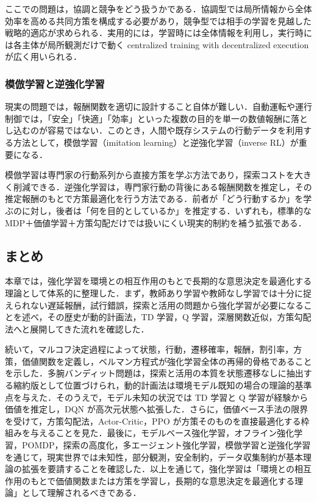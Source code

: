 ここでの問題は，協調と競争をどう扱うかである．協調型では局所情報から全体効率を高める共同方策を構成する必要があり，競争型では相手の学習を見越した戦略的適応が求められる．実用的には，学習時には全体情報を利用し，実行時には各主体が局所観測だけで動く centralized training with decentralized execution が広く用いられる．

\subsubsection{模倣学習と逆強化学習}

現実の問題では，報酬関数を適切に設計すること自体が難しい．自動運転や運行制御では，「安全」「快適」「効率」といった複数の目的を単一の数値報酬に落とし込むのが容易ではない．このとき，人間や既存システムの行動データを利用する方法として，模倣学習（imitation learning）と逆強化学習（inverse RL）が重要になる．

模倣学習は専門家の行動系列から直接方策を学ぶ方法であり，探索コストを大きく削減できる．逆強化学習は，専門家行動の背後にある報酬関数を推定し，その推定報酬のもとで方策最適化を行う方法である．前者が「どう行動するか」を学ぶのに対し，後者は「何を目的としているか」を推定する．いずれも，標準的な MDP＋価値学習＋方策勾配だけでは扱いにくい現実的制約を補う拡張である．

\subsection{まとめ}

本章では，強化学習を環境との相互作用のもとで長期的な意思決定を最適化する理論として体系的に整理した．まず，教師あり学習や教師なし学習では十分に捉えられない遅延報酬，試行錯誤，探索と活用の問題から強化学習が必要になることを述べ，その歴史が動的計画法，TD 学習，Q 学習，深層関数近似，方策勾配法へと展開してきた流れを確認した．

続いて，マルコフ決定過程によって状態，行動，遷移確率，報酬，割引率，方策，価値関数を定義し，ベルマン方程式が強化学習全体の再帰的骨格であることを示した．多腕バンディット問題は，探索と活用の本質を状態遷移なしに抽出する縮約版として位置づけられ，動的計画法は環境モデル既知の場合の理論的基準点を与えた．そのうえで，モデル未知の状況では TD 学習と Q 学習が経験から価値を推定し，DQN が高次元状態へ拡張した．さらに，価値ベース手法の限界を受けて，方策勾配法，Actor-Critic，PPO が方策そのものを直接最適化する枠組みを与えることを見た．最後に，モデルベース強化学習，オフライン強化学習，POMDP，探索の高度化，多エージェント強化学習，模倣学習と逆強化学習を通じて，現実世界では未知性，部分観測，安全制約，データ収集制約が基本理論の拡張を要請することを確認した．以上を通じて，強化学習は「環境との相互作用のもとで価値関数または方策を学習し，長期的な意思決定を最適化する理論」として理解されるべきである．



